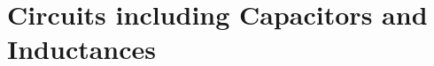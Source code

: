 \documentclass[11pt]{article}
\begin{document}
\newpage
\section{Circuits including Capacitors and Inductances}
\vspace{-5mm}

























































\end{document}
